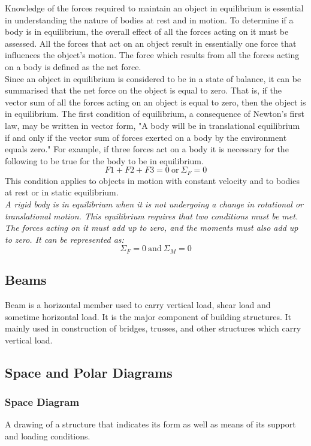 \documentclass[11pt]{article}
\begin{document}
Knowledge of the forces required to maintain an object in equilibrium is essential in understanding the nature of bodies at rest and in motion. To determine if a body is in equilibrium, the overall effect of all the forces acting on it must be assessed. All the forces that act on an object result in essentially one force that influences the object's motion. The force which results from all the forces acting on a body is defined as the net force.\\
Since an object in equilibrium is considered to be in a state of balance, it can be summarised that the net force on the object is equal to zero. That is, if the vector sum of all the forces acting on an object is equal to zero, then the object is in equilibrium. 
The first condition of equilibrium, a consequence of Newton's first law, may be written in vector form, "A body will be in translational equilibrium if and only if the vector sum of forces exerted on a body by the environment equals zero."
For example, if three forces act on a body it is necessary for the following to be true for the body to be in equilibrium.
$$F1 + F2 + F3 = 0\	\mathrm{or}\	\Sigma_F = 0 $$
This condition applies to objects in motion with constant velocity and to bodies at rest or in static equilibrium.\\

\textit{A rigid body is in equilibrium when it is not undergoing a change in rotational or translational motion. This equilibrium requires that two conditions must be met. The forces acting on it must add up to zero, and the moments must also add up to zero. It can be represented as:}
$$ \Sigma_F=0\  \mathrm{and}\  \Sigma_M=0 $$
\subsection{Beams}
Beam is a horizontal member used to carry vertical load, shear load and sometime horizontal load. It is the major component of building structures. It mainly used in construction of bridges, trusses, and other structures which carry vertical load.

\subsection{Space and Polar Diagrams}
\subsubsection{Space Diagram}
A drawing of a structure that indicates its form as well as means of its support and loading conditions.
\end{document}
